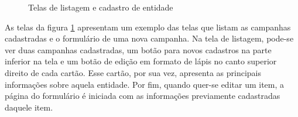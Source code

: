 \begin{figure}[ht!]
  \centering
            \qquad
    \caption[Telas de listagem e cadastro de entidade]{Telas de listagem e cadastro de entidade}
  
  \label{fig:entity_list_new_entity}
\end{figure}

As telas da figura \ref{fig:entity_list_new_entity} apresentam um exemplo das telas que listam as campanhas cadastradas e o formulário de uma nova campanha. Na tela de listagem, pode-se ver duas campanhas cadastradas, um botão para novos cadastros na parte inferior na tela e um botão de edição em formato de lápis no canto superior direito de cada cartão. Esse cartão, por sua vez, apresenta as principais informações sobre aquela entidade. Por fim, quando quer-se editar um item, a página do formulário é iniciada com as informações previamente cadastradas daquele item.


